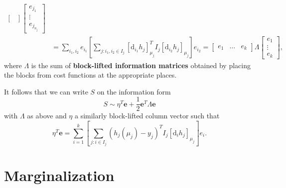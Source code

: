 $$\begin{aligned}
\begin{bmatrix}
    \end{bmatrix}
    \begin{bmatrix}
      e_{j_1} \\ \vdots \\ e_{j_{n_j}}
    \end{bmatrix}                                                                                                                                                                                            \\
     & = \sum_{i_1, i_2} e_{i_1} \left[\sum_{j : i_1, i_2 \in I_j} [\mathrm{d}_{i_1} h_j]_{\mu_j}^T I_j [\mathrm{d}_{i_2} h_j]_{\mu_j} \right]  e_{i_2} = \begin{bmatrix}
      e_1 & \ldots & e_k
    \end{bmatrix} \Lambda \begin{bmatrix}
      e_1 \\ \vdots \\ e_k
    \end{bmatrix},
  \end{aligned}
$$
where $\Lambda$ is the sum of \textbf{block-lifted information matrices} obtained by placing the blocks from cost functions at the appropriate places.

It follows that we can write $S$ on the information form
$$
  S \sim \eta^T \mathbf{e} + \frac{1}{2} \mathbf{e}^T \Lambda \mathbf{e}
$$
with $\Lambda$ as above and $\eta$ a similarly block-lifted column vector such that
$$
  \eta^T \mathbf{e} = \sum_{i=1}^k \left[ \sum_{j : i \in I_j} (h_j(\mu_j) - y_j)^T I_j [\mathrm{d}_i h_j]_{\mu_j} \right] e_i.
$$

\section{Marginalization}

